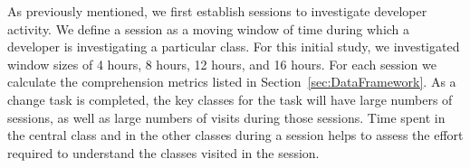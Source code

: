 As previously mentioned, we first establish sessions to investigate developer activity. We define a session as a moving window of time during which a developer is investigating a particular class. For this initial study, we investigated window sizes of 4 hours, 8 hours, 12 hours, and 16 hours.
For each session we calculate the comprehension metrics listed in Section~\ref{sec:DataFramework}. As a change task is completed, the key classes for the task will have large numbers of sessions, as well as large numbers of visits during those sessions. Time spent in the central class and in the other classes during a session helps to assess the effort required to understand the classes visited in the session.

